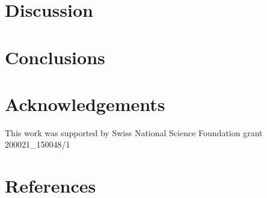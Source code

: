 \documentclass[preprint,12pt]{elsarticle}
\begin{document}
\section{Discussion}
\label{sec:discussion}



\section{Conclusions}
\label{sec:conclusions}



\section*{Acknowledgements}
\label{sec:ack}

This work was supported by Swiss National Science Foundation grant 200021\_150048/1


\section*{References}


\end{document}
